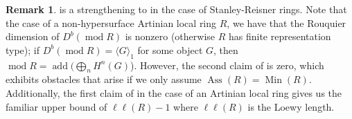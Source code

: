 \documentclass[11pt]{amsart}
\theoremstyle{plain}
\theoremstyle{definition}
\newtheorem{remark}[theorem]{Remark}
\numberwithin{equation}{section}
\numberwithin{theorem}{section}
\begin{document}
\begin{remark}\label{rmk:bounds}
     is a strengthening to \cite[Corollary 3.11]{Aihara/Takahashi:2015} in the case of Stanley-Reisner rings. Note that the case of a non-hypersurface Artinian local ring $R$, we have that the Rouquier dimension of $D^b (\operatorname{mod}R)$ is nonzero (otherwise $R$ has finite representation type); if $D^b(\operatorname{mod} R)= \langle G \rangle_1$ for some object $G$, then $\operatorname{mod} R= \operatorname{add}(\bigoplus_n H^n (G)$). However, the second claim of  is zero, which exhibits obstacles that arise if we only assume $\operatorname{Ass}(R)=\operatorname{Min}(R)$. Additionally, the first claim of  in the case of an Artinian local ring gives us the familiar upper bound of $\ell\ell(R)-1$ where $\ell\ell(R)$ is the Loewy length.
\end{remark}



\end{document}
